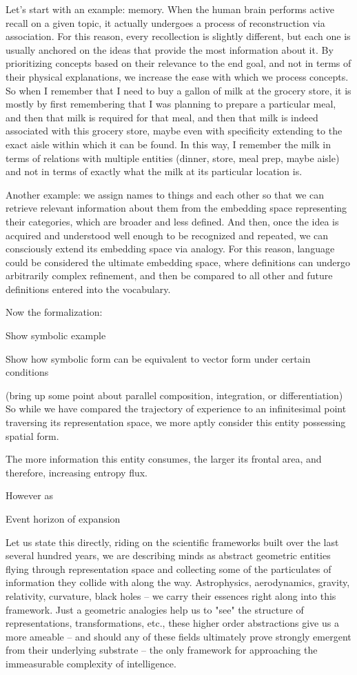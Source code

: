 Let's start with an example: memory. When the human brain performs active recall on a given topic, it actually undergoes a process of reconstruction via association. For this reason, every recollection is slightly different, but each one is usually anchored on the ideas that provide the most information about it. By prioritizing concepts based on their relevance to the end goal, and not in terms of their physical explanations, we increase the ease with which we process concepts. So when I remember that I need to buy a gallon of milk at the grocery store, it is mostly by first remembering that I was planning to prepare a particular meal, and then that milk is required for that meal, and then that milk is indeed associated with this grocery store, maybe even with specificity extending to the exact aisle within which it can be found. In this way, I remember the milk in terms of relations with multiple entities (dinner, store, meal prep, maybe aisle) and not in terms of exactly what the milk at its particular location is. 

Another example: we assign names to things and each other so that we can retrieve relevant information about them from the embedding space representing their categories, which are broader and less defined. And then, once the idea is acquired and understood well enough to be recognized and repeated, we can consciously extend its embedding space via analogy. For this reason, language could be considered the ultimate embedding space, where definitions can undergo arbitrarily complex refinement, and then be compared to all other and future definitions entered into the vocabulary.

Now the formalization:

Show symbolic example

Show how symbolic form can be equivalent to vector form under certain conditions

(bring up some point about parallel composition, integration, or differentiation) So while we have compared the trajectory of experience to an infinitesimal point traversing its representation space, we more aptly consider this entity possessing spatial form. 

The more information this entity consumes, the larger its frontal area, and therefore, increasing entropy flux. 

However as 

Event horizon of expansion

Let us state this directly, riding on the scientific frameworks built over the last several hundred years, we are describing minds as abstract geometric entities flying through representation space and collecting some of the particulates of information they collide with along the way. Astrophysics, aerodynamics, gravity, relativity, curvature, black holes -- we carry their essences right along into this framework. Just a geometric analogies help us to "see" the structure of representations, transformations, etc., these higher order abstractions give us a more ameable -- and should any of these fields ultimately prove strongly emergent from their underlying substrate -- the only framework for approaching the immeasurable complexity of intelligence. 

